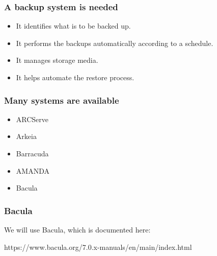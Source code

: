 \documentclass[10pt]{beamer}
\begin{document}
\begin{frame}
  \frametitle{A backup system is needed}

\begin{itemize}
\item It identifies what is to be backed up.
\item It performs the backups automatically according to a schedule.
\item It manages storage media.
\item It helps automate the restore process.
\end{itemize}
\end{frame}


\begin{frame}
  \frametitle{Many systems are available}

\begin{itemize}
\item ARCServe
\item Arkeia
\item Barracuda
\item AMANDA
\item Bacula
\end{itemize}
\end{frame}

\begin{frame}
  \frametitle{Bacula}

  We will use Bacula, which is documented here:
  
  https://www.bacula.org/7.0.x-manuals/en/main/index.html

\end{frame}
\end{document}
